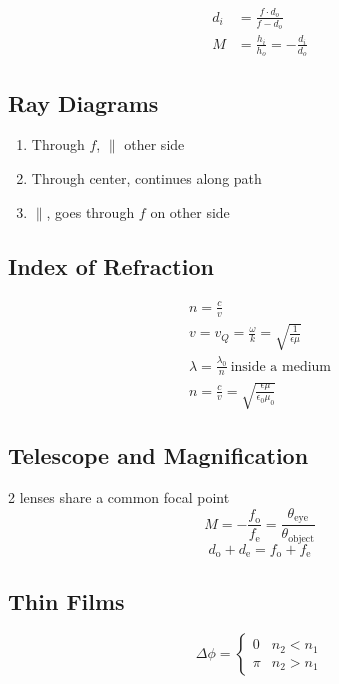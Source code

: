 \documentclass[10pt,letter]{article}
\begin{document}
\begin{align}
    d_i &= \frac{f\cdot d_o}{f-d_o}\\
    M &= \frac{h_i}{h_o} = -\frac{d_i}{d_o}
\end{align}

\subsection{Ray Diagrams}
\begin{enumerate}
    \item Through $f$, $\parallel$ other side
    \item Through center, continues along path
    \item $\parallel$, goes through $f$ on other side
\end{enumerate}

\subsection{Index of Refraction}
\begin{align}
    n=\frac{c}{v}  \\
    v = v_Q = \frac{\omega}{k} = \sqrt{\frac{1}{\epsilon \mu}}\\
    \lambda = \frac{\lambda_0}{n}~ \textrm{inside a medium}\\
    n = \frac{c}{v} = \sqrt{\frac{\epsilon \mu}{\epsilon_0 \mu_0}}
\end{align}

\subsection{Telescope and Magnification}
2 lenses share a common focal point
\begin{equation}
 M =  -\frac{f_\textrm{o}}{f_\textrm{e}} = \frac{\theta_\textrm{eye}}{\theta_\textrm{object}}
\end{equation}
\begin{equation}
 d_\textrm{o} + d_\textrm{e} = f_\textrm{o} + f_\textrm{e}
\end{equation}

\subsection{Thin Films}
\[
 \Delta \phi =
  \begin{cases}
   0 &n_2 < n_1\\
   \pi & n_2 > n_1
  \end{cases}
\]
\end{document}
